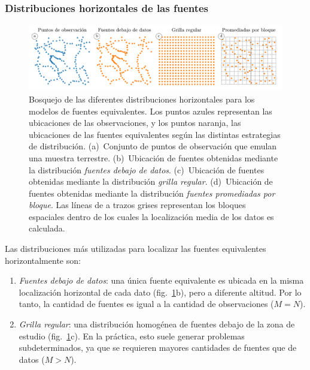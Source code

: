\subsubsection{Distribuciones horizontales de las fuentes}

\begin{figure}[tb]
    \includegraphics[width=\linewidth]{figs/eql-gradient-boosted/source-layouts-schematics.pdf}
    \caption{
        Bosquejo de las diferentes distribuciones horizontales para los modelos
        de fuentes equivalentes.
        Los puntos azules representan las ubicaciones de las observaciones,
        y los puntos naranja, las ubicaciones de las fuentes equivalentes según
        las distintas estrategias de distribución.
        (a)~Conjunto de \SourceLayoutsSchematicsObservations{} puntos de
        observación que emulan una muestra terrestre.
        (b)~Ubicación de \SourceLayoutsSchematicsSourceBelowData{} fuentes
        obtenidas mediante la distribución \emph{fuentes debajo de datos}.
        (c)~Ubicación de \SourceLayoutsSchematicsGridSources{} fuentes
        obtenidas mediante la distribución \emph{grilla regular}.
        (d)~Ubicación de \SourceLayoutsSchematicsBlockAveragedSources{} fuentes
        obtenidas mediante la distribución \emph{fuentes promediadas por
        bloque}. Las líneas de a trazos grises representan los bloques
        espaciales dentro de los cuales la localización media de los datos es
        calculada.
    }
    \label{fig:source_layouts}
\end{figure}

Las distribuciones más utilizadas para localizar las fuentes equivalentes
horizontalmente son:

\begin{enumerate}
  \item
    \emph{Fuentes debajo de datos}: una única fuente equivalente es ubicada en
    la misma localización horizontal de cada dato
    (fig.~\ref{fig:source_layouts}b), pero a diferente altitud. Por lo tanto,
    la cantidad de fuentes es igual a la cantidad de observaciones ($M=N$).
  \item
    \emph{Grilla regular}: una distribución homogénea de fuentes debajo de la
    zona de estudio (fig.~\ref{fig:source_layouts}c). En la práctica, esto
    suele generar problemas subdeterminados, ya que se requieren mayores
    cantidades de fuentes que de datos ($M>N$).
\end{enumerate}

